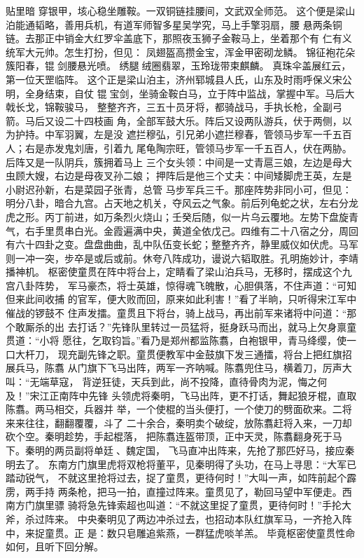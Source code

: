 贴里暗
穿银甲，垓心稳坐雕鞍。一双铜链挂腰间，文武双全师范。
这个便是梁山泊能通韬略，善用兵机，有道军师智多星吴学究，马上手擎羽扇，腰
悬两条铜链。去那正中销金大红罗伞盖底下，那照夜玉狮子金鞍马上，坐着那个有
仁有义统军大元帅。怎生打扮，但见：
凤翅盔高攒金宝，浑金甲密砌龙鳞。
锦征袍花朵簇阳春，锟剑腰悬光喷。
绣腿绒圈翡翠，玉玲珑带束麒麟。
真珠伞盖展红云，第一位天罡临阵。
这个正是梁山泊主，济州郓城县人氏，山东及时雨呼保义宋公明，全身结束，自仗
锟宝剑，坐骑金鞍白马，立于阵中监战，掌握中军。马后大戟长戈，锦鞍骏马，
整整齐齐，三五十员牙将，都骑战马，手执长枪，全副弓箭。马后又设二十四枝画
角，全部军鼓大乐。阵后又设两队游兵，伏于两侧，以为护持。中军羽翼，左是没
遮拦穆弘，引兄弟小遮拦穆春，管领马步军一千五百人；右是赤发鬼刘唐，引着九
尾龟陶宗旺，管领马步军一千五百人，伏在两胁。后阵又是一队阴兵，簇拥着马上
三个女头领：中间是一丈青扈三娘，左边是母大虫顾大嫂，右边是母夜叉孙二娘；
押阵后是他三个丈夫：中间矮脚虎王英，左是小尉迟孙新，右是菜园子张青，总管
马步军兵三千。那座阵势非同小可，但见：
明分八卦，暗合九宫。占天地之机关，夺风云之气象。前后列龟蛇之状，左右分龙
虎之形。丙丁前进，如万条烈火烧山；壬癸后随，似一片乌云覆地。左势下盘旋青
气，右手里贯串白光。金霞遍满中央，黄道全依戊己。四维有二十八宿之分，周回
有六十四卦之变。盘盘曲曲，乱中队伍变长蛇；整整齐齐，静里威仪如伏虎。马军
则一冲一突，步卒是或后或前。休夸八阵成功，谩说六韬取胜。孔明施妙计，李靖
播神机。
枢密使童贯在阵中将台上，定睛看了梁山泊兵马，无移时，摆成这个九宫八卦阵势，
军马豪杰，将士英雄，惊得魂飞魄散，心胆俱落，不住声道：“可知但来此间收捕
的官军，便大败而回，原来如此利害！”看了半晌，只听得宋江军中催战的锣鼓不
住声发擂。童贯且下将台，骑上战马，再出前军来诸将中问道：“那个敢厮杀的出
去打话？”先锋队里转过一员猛将，挺身跃马而出，就马上欠身禀童贯道：“小将
愿往，乞取钧旨。”看乃是郑州都监陈翥，白袍银甲，青马绛缨，使一口大杆刀，
现充副先锋之职。童贯便教军中金鼓旗下发三通擂，将台上把红旗招展兵马，陈翥
从门旗下飞马出阵，两军一齐呐喊。陈翥兜住马，横着刀，厉声大叫：“无端草寇，
背逆狂徒，天兵到此，尚不投降，直待骨肉为泥，悔之何及！”宋江正南阵中先锋
头领虎将秦明，飞马出阵，更不打话，舞起狼牙棍，直取陈翥。两马相交，兵器并
举，一个使棍的当头便打，一个使刀的劈面砍来。二将来来往往，翻翻覆覆，斗了
二十余合，秦明卖个破绽，放陈翥赶将入来，一刀却砍个空。秦明趁势，手起棍落，
把陈翥连盔带顶，正中天灵，陈翥翻身死于马下。秦明的两员副将单廷、魏定国，
飞马直冲出阵来，先抢了那匹好马，接应秦明去了。
东南方门旗里虎将双枪将董平，见秦明得了头功，在马上寻思：“大军已踏动锐气，
不就这里抢将过去，捉了童贯，更待何时！”大叫一声，如阵前起个霹雳，两手持
两条枪，把马一拍，直撞过阵来。童贯见了，勒回马望中军便走。西南方门旗里骠
骑将急先锋索超也叫道：“不就这里捉了童贯，更待何时！”手抡大斧，杀过阵来。
中央秦明见了两边冲杀过去，也招动本队红旗军马，一齐抢入阵中，来捉童贯。正
是：数只皂雕追紫燕，一群猛虎啖羊羔。
毕竟枢密使童贯性命如何，且听下回分解。